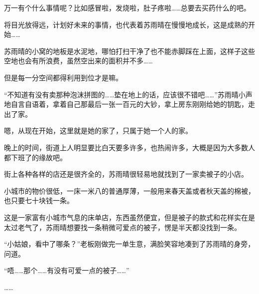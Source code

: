 万一有个什么事情呢？比如感冒啦，发烧啦，肚子疼啦……总要去买药什么的吧。

将目光放得远，计划好未来的事情，也代表着苏雨晴在慢慢地成长，这是成熟的开始……

苏雨晴的小窝的地板是水泥地，哪怕打扫干净了也不能赤脚踩在上面，这样子这些空地也会有所浪费，虽然空出来的面积并不多……

但是每一分空间都得利用到位才是嘛。

“不知道有没有卖那种泡沫拼图的……垫在地上的话，应该很不错吧……”苏雨晴小声地自言自语着，拿着自己那最后一张一百元的大钞，拿上房东刚刚给她的钥匙，走出了家。

嗯，从现在开始，这里就是她的家了，只属于她一个人的家。

晚上的时间，街道上人明显要比白天要多许多，也热闹许多，大概是因为大多数人都下班了的缘故吧。

街上各种各样的店还是很齐全的，苏雨晴很轻易地就找到了一家卖被子的小店。

小城市的物价很低，一床一米八的普通厚薄，一般用来春天盖或者秋天盖的棉被，也只要七十块钱一条。

这是一家富有小城市气息的床单店，东西虽然便宜，但是被子的款式和花样实在是太过老气了，苏雨晴想要找一条稍微可爱点的被子，愣是半天都没找到一条。

“小姑娘，看中了哪条？”老板刚做完一单生意，满脸笑容地凑到了苏雨晴的身旁，问道。

“唔……那个……有没有可爱一点的被子……”

……
